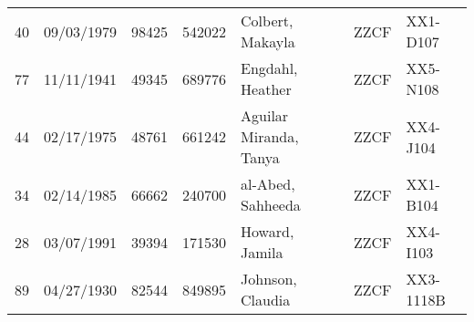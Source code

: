 \documentclass[]{article}
\begin{document}
\begin{tabular}{cccclll}
   40 & 09/03/1979 & 98425 & 542022 & Colbert, Makayla & ZZCF & XX1-D107 \\ 
   77 & 11/11/1941 & 49345 & 689776 & Engdahl, Heather & ZZCF & XX5-N108 \\ 
   44 & 02/17/1975 & 48761 & 661242 & Aguilar Miranda, Tanya & ZZCF & XX4-J104 \\ 
   34 & 02/14/1985 & 66662 & 240700 & al-Abed, Sahheeda & ZZCF & XX1-B104 \\ 
   28 & 03/07/1991 & 39394 & 171530 & Howard, Jamila & ZZCF & XX4-I103 \\ 
   89 & 04/27/1930 & 82544 & 849895 & Johnson, Claudia & ZZCF & XX3-1118B \\ 
  \end{tabular}
\end{document}
